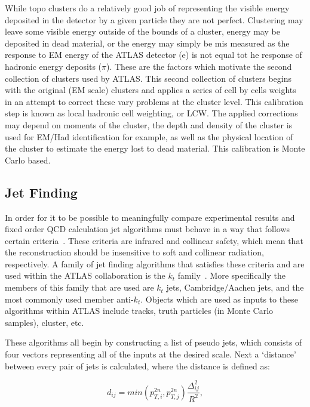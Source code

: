 While topo clusters do a relatively good job of representing the visible energy deposited in the detector by a given particle they are not perfect.  
Clustering may leave some visible energy outside of the bounds of a cluster, energy may be deposited in dead material, or the energy may simply be mis measured as the response to EM energy of the ATLAS detector (e) is not equal tot he response of hadronic energy deposits ($\pi$).  
These are the factors which motivate the second collection of clusters used by ATLAS.  
This second collection of clusters begins with the original (EM scale) clusters and applies a series of cell by cells weights in an attempt to correct these vary problems at the cluster level.  
This calibration step is known as local hadronic cell weighting, or LCW.  
The applied corrections may depend on moments of the cluster, the depth and density of the cluster is used for EM/Had identification for example, as well as the physical location of the cluster to estimate the energy lost to dead material.  
This calibration is Monte Carlo based.  

\subsection{Jet Finding}

In order for it to be possible to meaningfully compare experimental results and fixed order QCD calculation jet algorithms must behave in a way that follows certain criteria~\cite{Blazey:2000qt}.  
These criteria are infrared and collinear safety, which mean that the reconstruction should be insensitive to soft and collinear radiation, respectively.  
A family of jet finding algorithms that satisfies these criteria and are used within the ATLAS collaboration is the $k_t$ family~\cite{Cacciari:2008gp}.  
More specifically the members of this family that are used are $k_t$ jets, Cambridge/Aachen jets, and the most commonly used member anti-$k_t$.  
Objects which are used as inputs to these algorithms within ATLAS include tracks, truth particles (in Monte Carlo samples), cluster, etc.  

These algorithms all begin by constructing a list of pseudo jets, which consists of four vectors representing all of the inputs at the desired scale.  
Next a `distance' between every pair of jets is calculated, where the distance is defined as:

\begin{equation}
  d_{ij}=min\left(p_{T,i}^{2n}, p_{T,j}^{2n}\right)\frac{\Delta_{ij}^2}{R^2}, 
\end{equation}

